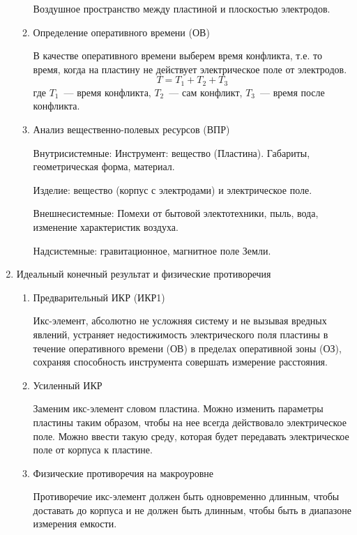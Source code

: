 \begin{enumerate}[1]
\begin{enumerate}
		Воздушное пространство между пластиной и плоскостью электродов.
		\item Определение оперативного времени (ОВ)
		
		В качестве оперативного времени выберем время конфликта, т.е. то время, когда на пластину не действует электрическое поле от электродов.
		\begin{equation}
		T = T_1 + T_2 + T_3
		\end{equation}
		где $T_1$~--- время конфликта, $T_2$~--- сам конфликт, $T_3$~--- время после конфликта.
		
		\item Анализ вещественно-полевых ресурсов (ВПР)
		
		Внутрисистемные:
		Инструмент: вещество (Пластина). Габариты, геометрическая форма, материал.
		
		Изделие: вещество (корпус с электродами) и электрическое поле.
		
		Внешнесистемные: Помехи от бытовой электотехники, пыль, вода, изменение характеристик воздуха.
		
		Надсистемные: гравитационное, магнитное поле Земли.
		
	\end{enumerate}	
	
	\item Идеальный конечный результат и физические противоречия
	\begin{enumerate}
		\item Предварительный ИКР (ИКР1)
		
			Икс-элемент, абсолютно не усложняя систему и не вызывая вредных явлений, устраняет недостижимость электрического поля пластины в течение оперативного времени (ОВ) 	в пределах оперативной зоны (ОЗ), сохраняя способность инструмента совершать измерение расстояния.
		
		\item Усиленный ИКР

			Заменим икс-элемент словом пластина. Можно изменить параметры пластины таким образом, чтобы на нее всегда действовало электрическое поле.
			Можно ввести такую среду, которая будет передавать электрическое поле от корпуса к пластине.

		\item Физические противоречия на макроуровне
		
			Противоречие икс-элемент должен быть одновременно длинным, чтобы доставать до корпуса и не должен быть длинным, чтобы быть в диапазоне измерения емкости.


\end{enumerate}
\end{enumerate}
